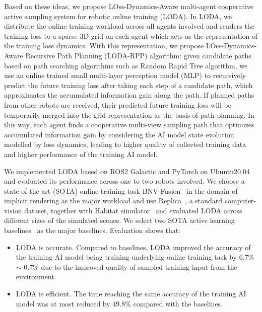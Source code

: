 Based on these ideas, we propose LOss-Dynamics-Aware multi-agent cooperative active sampling system for robotic online training (LODA).
In LODA, we distribute the online training workload across all agents involved and renders the training loss to a sparse 3D grid on each agent which acts as the representation of the training loss dynamics.
With this representation, we propose LOss-Dynamics-Aware Recursive Path Planning (LODA-RPP) algorithm: given candidate paths based on path searching algorithms such as Random Rapid Tree algorithm, we use an online trained small multi-layer perception model (MLP) to recursively predict the future training loss after taking each step of a candidate path, which approximates the accumulated information gain along the path.
If planned paths from other robots are received, their predicted future training loss will be temporarily merged into the grid representation as the basis of path planning.
In this way, each agent finds a cooperative multi-view sampling path that optimizes accumulated information gain by considering the AI model state evolution modelled by loss dynamics, leading to higher quality of collected training data and higher performance of the training AI model.

We implemented LODA based on ROS2 Galactic and PyTorch on Ubuntu20.04 and evaluated its performance across one to two robots involved.
We choose a state-of-the-art (SOTA) online training task BNV-Fusion~\cite{li2022bnvfusion} in the domain of implicit rendering as the major workload and use Replica~\cite{straub_replica_2019}, a standard computer-vision dataset, together with Habitat simulator~\cite{szot2021habitat} and evaluated LODA across different sizes of the simulated scenes.
We select two SOTA active learning baselines~\cite{ash2020deep,avidan_activenerf_2022} as the major baselines.
Evaluation shows that:
\begin{itemize}
    \item LODA is accurate. Compared to baselines, LODA improved the accuracy of the training AI model being training underlying online training task by 6.7\% $\sim$ 0.7\% due to the improved quality of sampled training input from the environment.
    \item LODA is efficient. The time reaching the same accuracy of the training AI model was at most reduced by 49.8\% compared with the baselines.
\end{itemize}

